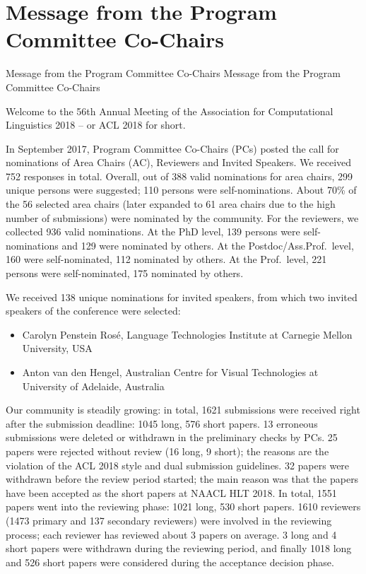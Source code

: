 \section{Message from the Program Committee Co-Chairs}
\setheaders%
    {Message from the Program Committee Co-Chairs}%
    {Message from the Program Committee Co-Chairs}
\thispagestyle{emptyheader}

\setlength{\parskip}{.7ex}


Welcome to the 56th Annual Meeting of the Association for Computational Linguistics 2018 -- or ACL 2018 for short. 

In September 2017, Program Committee Co-Chairs (PCs) posted the call for nominations of Area Chairs (AC), Reviewers and Invited Speakers. We received 752 responses in total. Overall, out of 388 valid nominations for area chairs, 299 unique persons were suggested; 110 persons were self-nominations. About 70\% of the 56 selected area chairs (later expanded to 61 area chairs due to the high number of submissions) were nominated by the community. For the reviewers, we collected 936 valid nominations. At the PhD level, 139 persons were self-nominations and 129 were nominated by others. At the Postdoc/Ass.Prof.~level, 160 were self-nominated, 112 nominated by others. At the Prof.~level, 221 persons were self-nominated, 175 nominated by others. 

We received 138 unique nominations for invited speakers, from which two invited speakers of the conference were selected: 
\begin{itemize}
	\item Carolyn Penstein Rosé, Language Technologies Institute at Carnegie Mellon University, USA
	\item Anton van den Hengel, Australian Centre for Visual Technologies at University of Adelaide, Australia
\end{itemize}


Our community is steadily growing: in total, 1621 submissions were received right after the submission deadline: 1045 long, 576 short papers. 13 erroneous submissions were deleted or withdrawn in the preliminary checks by PCs. 25 papers were rejected without review (16 long, 9 short); the reasons are the violation of the ACL 2018 style and dual submission guidelines. 32 papers were withdrawn before the review period started; the main reason was that the papers have been accepted as the short papers at NAACL HLT 2018. In total, 1551 papers went into the reviewing phase: 1021 long, 530 short papers. 1610 reviewers (1473 primary and 137 secondary reviewers) were involved in the reviewing process; each reviewer has reviewed about 3 papers on average.  3 long and 4 short papers were withdrawn during the reviewing period, and finally 1018 long and 526 short papers were considered during the acceptance decision phase.

